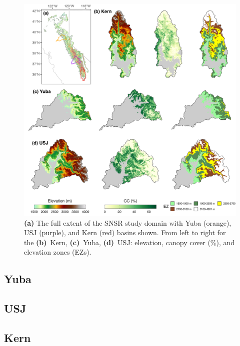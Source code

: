 \begin{figure}[t]
\centering
\includegraphics[width=14cm]{figures/ch2_figs/kuy_study_area_v2.png}
\caption{\textbf{(a)} The full extent of the SNSR study domain with Yuba (orange), USJ (purple), and Kern (red) basins shown. From left to right for the \textbf{(b)}~Kern, \textbf{(c)}~Yuba, \textbf{(d)}~USJ: elevation, canopy cover (\%), and elevation zones (EZs).}
\label{kuy_study_area}
\end{figure}
\hypertarget{ch2-sa-1}{\subsection{Yuba}\label{ch2-sa-1}}


\hypertarget{ch2-sa-2}{\subsection{USJ}\label{ch2-sa-2}}


\hypertarget{ch2-sa-3}{\subsection{Kern}\label{ch2-sa-3}}


